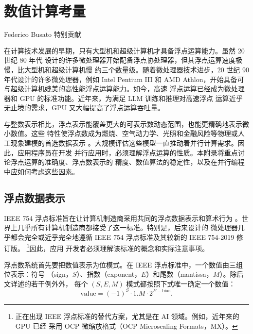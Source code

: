 \chapter{数值计算考量}
\label{app:numerical-considerations}

\begin{center}
  \small Federico Busato 特别贡献
\end{center}

在计算技术发展的早期，只有大型机和超级计算机才具备浮点运算能力。虽然 20 世纪 80 年代
设计的许多微处理器开始配备浮点协处理器，但其浮点运算速度极慢，比大型机和超级计算机慢
约三个数量级。随着微处理器技术进步，20 世纪 90 年代设计的许多微处理器，例如 Intel
Pentium III 和 AMD Athlon，开始具备可与超级计算机媲美的高性能浮点运算能力。如今，高速
浮点运算已经成为微处理器和 GPU 的标准功能。近年来，为满足 LLM 训练和推理对高速浮点
运算近乎无止境的需求，GPU 又大幅提高了浮点运算吞吐量。

与整数表示相比，浮点表示能覆盖更大的可表示数动态范围，也能更精确地表示微小数值。这些
特性使浮点数成为燃烧、空气动力学、光照和金融风险等物理或人工现象建模的首选数据表示
\cite{appa-goldberg}。大规模评估这些模型一直推动着并行计算需求。因此，应用程序员在开发
并行应用时，必须理解浮点运算的性质。本附录将重点讨论浮点运算的准确度、浮点数表示的
精度、数值算法的稳定性，以及在并行编程中应如何考虑这些因素。

\section{浮点数据表示}
\label{sec:appa-floating-point-representation}

IEEE 754 浮点标准旨在让计算机制造商采用共同的浮点数据表示和算术行为
\cite{appa-ieee754}。世界上几乎所有计算机制造商都接受了这一标准。特别是，后来设计的
微处理器几乎都会完全或近乎完全地遵循 IEEE 754 浮点标准及其较新的 IEEE 754-2019 修订版。
\footnote{正在出现 IEEE 浮点标准的替代方案，尤其是在 AI 领域。例如，近年来的 GPU 已经
采用 OCP 微缩放格式（OCP Microscaling Formats，MX）\cite{appa-ocp-mx}。}因此，应用
开发者必须理解该标准的概念和实际注意事项。

浮点数系统首先要把数值表示为位模式。在 IEEE 浮点标准中，一个数值由三组位表示：符号
（sign，$S$）、指数（exponent，$E$）和尾数（mantissa，$M$）。除后文详述的若干例外外，
每个 $(S,E,M)$ 模式都按照下式唯一确定一个数值：
\begin{equation}
  \text{value}=(-1)^S\cdot 1.M\cdot 2^{E-\text{bias}}.
  \label{eq:appa-value}
\end{equation}

